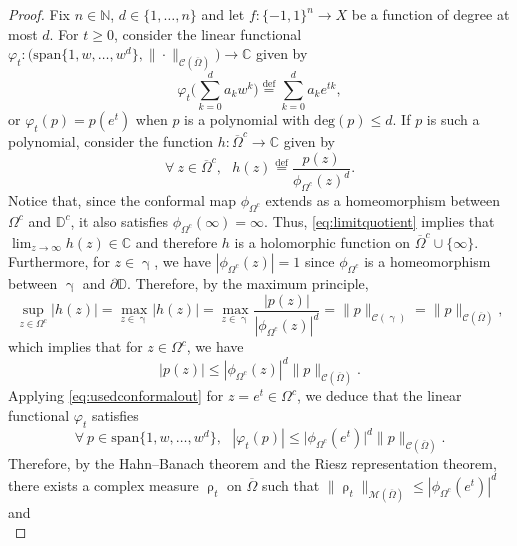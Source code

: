 \documentclass[11pt,reqno]{amsart}
\renewcommand{\leq}{\leqslant}
\renewcommand{\geq}{\geqslant}
\renewcommand{\gamma}{\upgamma}
\newcommand{\1}{\mathbf 1}
\theoremstyle{remark}
\renewcommand{\rho}{\uprho}
\newcommand{\C}{\mathbb C}
\newcommand{\N}{\mathbb N}
\newcommand{\eqdef}{\stackrel{\mathrm{def}}{=}}
\renewcommand{\gamma}{\upgamma}
\renewcommand{\rho}{\uprho}
\newcommand{\mb}{\mathbb}
\newcommand{\ms}{\mathscr}
\begin{document}
\begin{proof}
Fix $n\in\N$, $d\in\{1,\ldots,n\}$ and let $f:\{-1,1\}^n\to X$ be a function of degree at most $d$. For $t\geq0$, consider the linear functional $\varphi_t : \big(\mathrm{span}\{1,w,\ldots,w^d\},\|\cdot\|_{\ms{C}(\overline{\Omega})}\big)\to \C$ given by
\begin{equation}
\varphi_t\Big(\sum_{k=0}^d a_k w^k\Big) \eqdef \sum_{k=0}^d a_k e^{tk},
\end{equation}
or $\varphi_t(p) = p(e^t)$ when $p$ is a polynomial with $\mathrm{deg}(p)\leq d$. If $p$ is such a polynomial, consider the function $h:\overline{\Omega}^c\to \mb{C}$ given by
\begin{equation}
\forall \ z\in\overline{\Omega}^c, \ \ \ h(z) \eqdef \frac{p(z)}{\phi_{\Omega^c}(z)^d}.
\end{equation}
Notice that, since the conformal map $\phi_{\Omega^c}$ extends as a homeomorphism between $\Omega^c$ and $\mb{D}^c$, it also satisfies $\phi_{\Omega^c}(\infty)=\infty$. Thus, \eqref{eq:limitquotient} implies that $\lim_{z\to\infty} h(z)\in\mb{C}$ and therefore $h$ is a holomorphic function on $\overline{\Omega}^c\cup\{\infty\}$. Furthermore, for $z\in\gamma$, we have $|\phi_{\Omega^c}(z)| = 1$ since $\phi_{\Omega^c}$ is a homeomorphism between $\gamma$ and $\partial\mb{D}$. Therefore, by the maximum principle,
\begin{equation}
\sup_{z\in\Omega^c} |h(z)| = \max_{z\in\gamma} |h(z)| = \max_{z\in\gamma}\frac{|p(z)|}{|\phi_{\Omega^c}(z)|^d} = \|p\|_{\ms{C}(\gamma)} = \|p\|_{\ms{C}(\overline{\Omega})},
\end{equation}
which implies that for $z\in\Omega^c$, we have
\begin{equation} \label{eq:usedconformalout}
|p(z)| \leq |\phi_{\Omega^c}(z)|^d \|p\|_{\ms{C}(\overline{\Omega})}.
\end{equation}
Applying \eqref{eq:usedconformalout} for $z=e^t \in\Omega^c$, we deduce that the linear functional $\varphi_t$ satisfies
\begin{equation} \label{ineq2}
\forall \ p\in\mathrm{span}\{1,w,\ldots,w^d\}, \ \ \ |\varphi_t(p)| \leq \big|\phi_{\Omega^c}(e^t)\big|^d \|p\|_{\ms{C}(\overline{\Omega})}.
\end{equation}
Therefore, by the Hahn--Banach theorem and the Riesz representation theorem, there exists a complex measure $\rho_t$ on $\overline{\Omega}$ such that $\|\rho_t\|_{\ms{M}(\overline{\Omega})}\leq |\phi_{\Omega^c}(e^t)|^d$ and
\begin{equation} \label{ide2}

\end{equation}
\end{proof}
\end{document}
